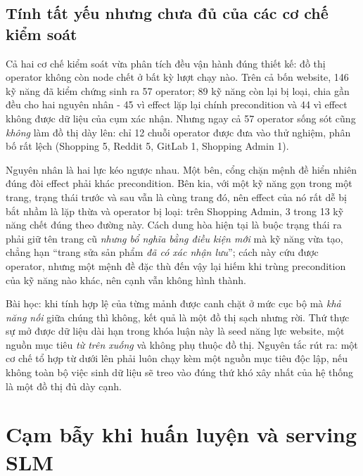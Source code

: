 \subsection{Tính tất yếu nhưng chưa đủ của các cơ chế kiểm soát}

Cả hai cơ chế kiểm soát vừa phân tích đều vận hành đúng thiết kế: đồ thị
operator không còn node chết ở bất kỳ lượt chạy nào. Trên cả bốn website, 146
kỹ năng đã kiểm chứng sinh ra 57 operator; 89 kỹ năng còn lại bị loại, chia gần
đều cho hai nguyên nhân - 45 vì effect lặp lại chính precondition và 44 vì
effect không được dữ liệu của cụm xác nhận. Nhưng ngay cả 57 operator sống sót
cũng \emph{không} làm đồ thị dày lên: chỉ 12 chuỗi operator được đưa vào thử
nghiệm, phân bố rất lệch (Shopping 5, Reddit 5, GitLab 1, Shopping Admin 1).

Nguyên nhân là hai lực kéo ngược nhau. Một bên, cổng chặn mệnh đề hiển nhiên
đúng đòi effect phải khác precondition. Bên kia, với một kỹ năng gọn trong một
trang, trạng thái trước và sau vẫn là cùng trang đó, nên effect của nó rất dễ
bị bắt nhầm là lặp thừa và operator bị loại: trên Shopping Admin, 3 trong 13 kỹ
năng chết đúng theo đường này. Cách dung hòa hiện tại là buộc trạng thái ra
phải giữ tên trang cũ \emph{nhưng bổ nghĩa bằng điều kiện mới} mà kỹ năng vừa
tạo, chẳng hạn ``trang sửa sản phẩm \emph{đã có xác nhận lưu}''; cách này cứu
được operator, nhưng một mệnh đề đặc thù đến vậy lại hiếm khi trùng precondition
của kỹ năng nào khác, nên cạnh vẫn không hình thành.

Bài học: khi tính hợp lệ của từng mảnh được canh chặt ở mức cục bộ mà
\emph{khả năng nối} giữa chúng thì không, kết quả là một đồ thị sạch nhưng rời.
Thứ thực sự mở được dữ liệu dài hạn trong khóa luận này là seed năng lực
website, một nguồn mục tiêu \emph{từ trên xuống} và không phụ thuộc đồ thị.
Nguyên tắc rút ra: một cơ chế tổ hợp từ dưới lên phải luôn chạy kèm một nguồn
mục tiêu độc lập, nếu không toàn bộ việc sinh dữ liệu sẽ treo vào đúng thứ khó
xây nhất của hệ thống là một đồ thị đủ dày cạnh.

\section{Cạm bẫy khi huấn luyện và serving SLM}
\label{sec:disc-slm}

